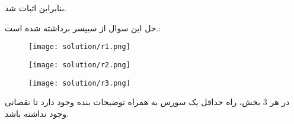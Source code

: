 بنابراین اثبات شد. 

حل این سوال از سیپسر برداشته شده است.:

\begin{figure}[H]
    \centering
    \texttt{[image: solution/r1.png]}
\end{figure}
\begin{figure}[H]
    \centering
    \texttt{[image: solution/r2.png]}
\end{figure}
\begin{figure}[H]
    \centering
    \texttt{[image: solution/r3.png]}
\end{figure}

در هر 3 بخش، راه حداقل یک سورس به همراه توضیحات بنده وجود دارد تا نقصانی وجود نداشته باشد.